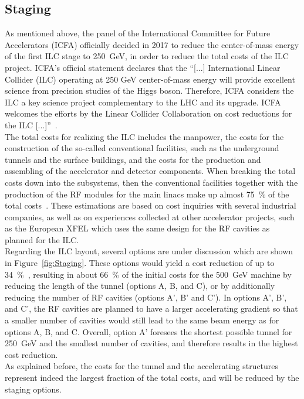 \subsection{Staging}
\label{ILC:layout:staging}
As mentioned above, the panel of the International Committee for Future Accelerators (ICFA) officially decided in 2017 to reduce the center-of-mass energy of the first ILC stage to \SI{250}{\GeV}, in order to reduce the total costs of the ILC project.
ICFA's official statement declares that the ``[...] International Linear Collider (ILC) operating at 250 GeV center-of-mass energy will provide excellent science from precision studies of the Higgs boson.
Therefore, ICFA considers the ILC a key science project complementary to the LHC and its upgrade.
ICFA welcomes the efforts by the Linear Collider Collaboration on cost reductions for the ILC [...]''~\cite{ICFA_Statement}.\\
The total costs for realizing the ILC includes the manpower, the costs for the construction of the so-called conventional facilities, such as the underground tunnels and the surface buildings, and the costs for the production and assembling of the accelerator and detector components.
When breaking the total costs down into the subsystems, then the conventional facilities together with the production of the RF modules for the main linacs make up almost \SI{75}{\percent} of the total costs~\cite[p. 20f]{TDR1}.
These estimations are based on cost inquiries with several industrial companies, as well as on experiences collected at other accelerator projects, such as the European XFEL which uses the same design for the RF cavities as planned for the ILC.\\
Regarding the ILC layout, several options are under discussion which are shown in Figure~\ref{fig:Staging}.
These options would yield a cost reduction of up to \SI{34}{\percent}~\cite{Cost_reduction}, resulting in about \SI{66}{\percent} of the initial costs for the \SI{500}{\GeV} machine by reducing the length of the tunnel (options A, B, and C), or by additionally reducing the number of RF cavities (options A', B' and C').
In options A', B', and C', the RF cavities are planned to have a larger accelerating gradient so that a smaller number of cavities would still lead to the same beam energy as for options A, B, and C.
Overall, option A' foresees the shortest possible tunnel for \SI{250}{\GeV} and the smallest number of cavities, and therefore results in the highest cost reduction.\\
As explained before, the costs for the tunnel and the accelerating structures represent indeed the largest fraction of the total costs, and will be reduced by the staging options.
